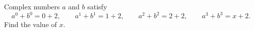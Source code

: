 Complex numbers $a$ and $b$ satisfy
\[a^0+b^0=0+2,\qquad a^1+b^1=1+2,\qquad a^2+b^2=2+2,\qquad a^3+b^3=x+2.\]
Find the value of $x$.
